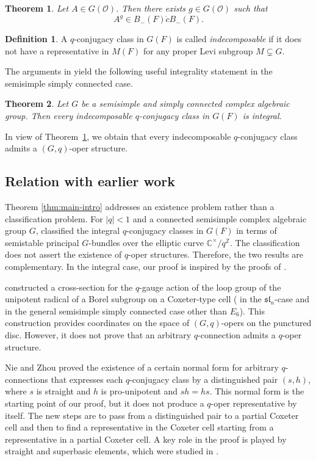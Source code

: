 \documentclass[11pt]{amsart}
\numberwithin{equation}{section}
\newtheorem{theorem}{Theorem}[section]
\theoremstyle{definition}
\newtheorem{definition}[definition]{Definition}
\theoremstyle{remark}
\begin{document}
\begin{theorem}\label{thm:integral-intro}
Let $A\in G(\mathcal O)$. Then there exists $g\in G(\mathcal O)$ such that
\[
  A^g\in B_-(F)\dot cB_-(F).
\]
\end{theorem}
\begin{definition}
A $q$-conjugacy class in $G(F)$ is called \emph{indecomposable} if
it does not have a
representative in $M(F)$ for any proper Levi subgroup
$M\subsetneq G$.  
\end{definition}
The arguments in \cite{NZ} yield the following useful integrality statement in the semisimple simply connected case. 
\begin{theorem}\label{thm:indecomp-intro}
Let $G$ be a semisimple and simply connected complex algebraic group. Then every indecomposable $q$-conjugacy class in $G(F)$ is integral. 
\end{theorem}
In view of Theorem~\ref{thm:integral-intro}, we obtain that every indecomposable $q$-conjugacy class admits a $(G,q)$-oper structure.
\subsection{Relation with earlier work} Theorem \ref{thm:main-intro} addresses an existence problem rather than a classification problem. For $|q|<1$ and a connected semisimple complex algebraic group $G$, \cite[Theorem~1.2]{BG} classified the integral $q$-conjugacy classes in $G(F)$ in terms of semistable principal $G$-bundles over the elliptic curve $\mathbb{C}^{\times}/q^{\mathbb{Z}}$. The classification does not assert the existence of $q$-oper structures. Therefore, the two results are complementary. In the integral case, our proof is inspired by the proofs of \cite[Proposition~2.1, Lemma~2.2]{BG}. 

\cite{FRS,SS} constructed a cross-section for the $q$-gauge action of the loop group of the unipotent radical of a Borel subgroup on a Coxeter-type cell (\cite{FRS} in the $\mathfrak{sl}_n$-case and \cite{SS} in the general semisimple simply connected case other than $E_6$). This construction provides coordinates on the space of $(G,q)$-opers on the punctured disc. However, it does not prove that an arbitrary $q$-connection admits a $q$-oper structure. 

Nie and Zhou \cite[Theorem~1.1]{NZ} proved the existence of a certain normal form for arbitrary $q$-connections that expresses each $q$-conjugacy class by a distinguished pair $(s,h)$, where $s$ is straight and $h$ is pro-unipotent and $sh=hs$. This normal form is the starting point of our proof, but it does not produce a $q$-oper representative by itself. The new steps are to pass from a distinguished pair to a partial Coxeter cell and then to find a representative in the Coxeter cell starting from a representative in a partial Coxeter cell. A key role in the proof is played by straight and superbasic elements, which were studied in \cite{HN}.
\end{document}
